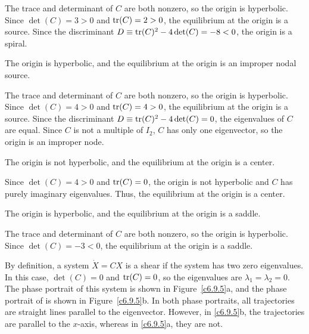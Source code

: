\documentclass{ximera}
\begin{document}
\soln The trace and determinant of $C$ are both nonzero, so the origin
is hyperbolic.  Since $\det(C) = 3 > 0$ and ${\rm tr}(C) = 2 > 0$,
the equilibrium at the origin is a source.  Since the discriminant
$D \equiv {\rm tr}(C)^2 - 4\det(C) = -8 < 0$, the origin is a spiral.

 \ans The origin is hyperbolic, and the equilibrium at the origin
is an improper nodal source.

\soln The trace and determinant of $C$ are both nonzero, so the origin
is hyperbolic.  Since $\det(C) = 4 > 0$ and ${\rm tr}(C) = 4 > 0$,
the equilibrium at the origin is a source.  Since the discriminant
$D \equiv {\rm tr}(C)^2 - 4\det(C) = 0$, the eigenvalues of $C$ are equal.
Since $C$ is not a multiple of $I_2$, $C$ has only one eigenvector, so
the origin is an improper node.

 \ans The origin is not hyperbolic, and the equilibrium at
the origin is a center.

\soln Since $\det(C) = 4 > 0$ and ${\rm tr}(C) = 0$, the origin is not
hyperbolic and $C$ has purely imaginary eigenvalues.  Thus, the
equilibrium at the origin is a center.

 \ans The origin is hyperbolic, and the equilibrium at the origin
is a saddle.

\soln The trace and determinant of $C$ are both nonzero, so the origin
is hyperbolic.  Since $\det(C) = -3 < 0$, the equilibrium at the origin 
is a saddle.

By definition, a system $\dot{X} = CX$ is a shear if the system has two
zero eigenvalues.  In this case, $\det(C) = 0$ and ${\rm tr}(C) = 0$, so
the eigenvalues are $\lambda_1 = \lambda_2 = 0$.  The phase portrait of
this system is shown in Figure~\ref{c6.9.5}a, and the phase portrait of
 is shown in Figure~\ref{c6.9.5}b.  In both phase portraits,
all trajectories are straight lines parallel to the eigenvector.  However,
in \ref{c6.9.5}b, the trajectories are parallel to the $x$-axis, whereas
in \ref{c6.9.5}a, they are not.

\begin{figure}[htb]
                       \centerline{%
                       }
\end{figure}
\end{document}
